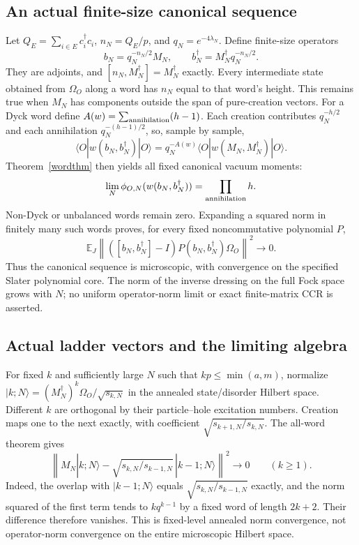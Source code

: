 \documentclass[11pt]{article}
\newcommand{\EE}{\mathbb E}
\newcommand{\Om}{\Omega_O}
\begin{document}
\subsection*{An actual finite-size canonical sequence}
Let $Q_E=\sum_{i\in E}c_i^\dagger c_i$, $n_N=Q_E/p$, and
$q_N=e^{-4\lambda_N}$. Define finite-size operators
\begin{equation}\label{microb}
 b_N=q_N^{-n_N/2}M_N,\qquad
 b_N^\dagger=M_N^\dagger q_N^{-n_N/2}.
\end{equation}
They are adjoints, and $[n_N,M_N^\dagger]=M_N^\dagger$ exactly.
Every intermediate state obtained from $\Om$ along a word has
$n_N$ equal to that word's height. This remains true when $M_N$
has components outside the span of pure-creation vectors.
For a Dyck word define $A(w)=\sum_{\rm annihilation}(h-1)$.
Each creation contributes $q_N^{-h/2}$ and each annihilation
$q_N^{-(h-1)/2}$, so, sample by sample,
\begin{equation}\label{microword}
 \langle O|w(b_N,b_N^\dagger)|O\rangle
 =q_N^{-A(w)}\langle O|w(M_N,M_N^\dagger)|O\rangle.
\end{equation}
Theorem~\ref{wordthm} then yields all fixed canonical vacuum moments:
\begin{equation}
 \lim_N\phi_{O,N}(w(b_N,b_N^\dagger))
 =\prod_{\rm annihilation}h.
\end{equation}
Non-Dyck or unbalanced words remain zero. Expanding a squared norm
in finitely many such words proves, for every fixed noncommutative
polynomial $P$,
\begin{equation}\label{coreccr}
 \EE_J\left\|([b_N,b_N^\dagger]-I)
        P(b_N,b_N^\dagger)\Om\right\|^2\longrightarrow0.
\end{equation}
Thus the canonical sequence is microscopic, with convergence on the
specified Slater polynomial core. The norm of the inverse dressing
on the full Fock space grows with $N$; no uniform operator-norm
limit or exact finite-matrix CCR is asserted.

\newpage
\subsection*{Actual ladder vectors and the limiting algebra}
For fixed $k$ and sufficiently large $N$ such that $kp\le\min(a,m)$, normalize
$|k;N\rangle=(M_N^\dagger)^k\Om/\sqrt{s_{k,N}}$ in the annealed
state/disorder Hilbert space. Different $k$ are orthogonal by their
particle--hole excitation numbers. Creation maps one to the next
exactly, with coefficient $\sqrt{s_{k+1,N}/s_{k,N}}$.
The all-word theorem gives
\begin{equation}\label{strongladder}
 \left\|M_N|k;N\rangle
       -\sqrt{s_{k,N}/s_{k-1,N}}\,|k-1;N\rangle\right\|^2
 \longrightarrow0\qquad(k\ge1).
\end{equation}
Indeed, the overlap with $|k-1;N\rangle$ equals
$\sqrt{s_{k,N}/s_{k-1,N}}$ exactly, and the norm squared of the
first term tends to $kq^{k-1}$ by a fixed word of length $2k+2$.
Their difference therefore vanishes. This is fixed-level annealed
norm convergence, not operator-norm convergence on the entire
microscopic Hilbert space.
\end{document}

